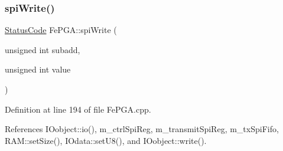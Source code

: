 \subsubsection{\texorpdfstring{spi\+Write()}{spiWrite()}\hspace{0.1cm}{\footnotesize\ttfamily [3/3]}}
{\footnotesize\ttfamily \hyperlink{classStatusCode}{Status\+Code} Fe\+P\+G\+A\+::spi\+Write (\begin{DoxyParamCaption}\item[{unsigned int}]{subadd,  }\item[{unsigned int}]{value }\end{DoxyParamCaption})}



Definition at line 194 of file Fe\+P\+G\+A.\+cpp.



References I\+Oobject\+::io(), m\+\_\+ctrl\+Spi\+Reg, m\+\_\+transmit\+Spi\+Reg, m\+\_\+tx\+Spi\+Fifo, R\+A\+M\+::set\+Size(), I\+Odata\+::set\+U8(), and I\+Oobject\+::write().


